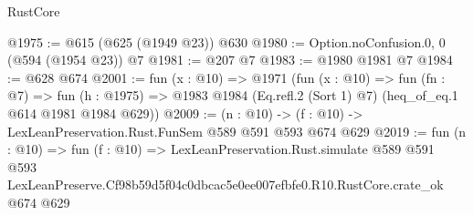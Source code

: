 \begin{lexlean}{RustCore}
\begin{coremodule}
@1975 := @615 (@625 (@1949 @23)) @630
@1980 := Option.noConfusion.{0, 0} (@594 (@1954 @23)) @7
@1981 := @207 @7
@1983 := @1980 @1981 @7
@1984 := @628 @674
@2001 := fun (x : @10) =>
  @1971
    (fun (x : @10) =>
    fun (fn : @7) =>
    fun (h : @1975) => @1983 @1984 (Eq.refl.{2} (Sort 1) @7) (heq_of_eq.{1} @614 @1981 @1984 @629))
@2009 := (n : @10) -> (f : @10) -> LexLeanPreservation.Rust.FunSem @589 @591 @593 @674 @629
@2019 := fun (n : @10) =>
  fun (f : @10) =>
  LexLeanPreservation.Rust.simulate
    @589
    @591
    @593
    LexLeanPreserve.Cf98b59d5f04c0dbcac5e0ee007efbfe0.R10.RustCore.crate_ok
    @674
    @629
\end{coremodule}
\end{lexlean}

